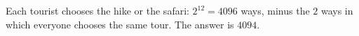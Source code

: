 Each tourist chooses the hike or the safari: $2^{12}=4096$ ways, minus the $2$ ways in which everyone chooses the same tour. The answer is $\boxed{4094}$.
